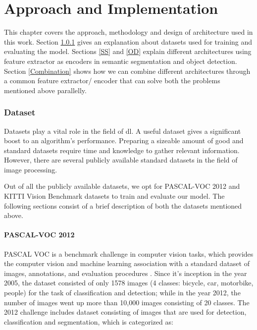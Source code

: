 
\lhead{\thepage}

\chapter{Approach and Implementation}

This chapter covers the approach, methodology and design of architecture used in this work. Section \ref{Dataset} gives an explanation about datasets used for training and evaluating the model. Sections \ref{SS} and \ref{OD} explain different architectures using feature extractor as encoders in semantic segmentation and object detection. Section \ref{Combination} shows how we can combine different architectures through a common feature extractor/ encoder that can solve both the problems mentioned above parallelly. 

\subsection{Dataset} \label{Dataset}

Datasets play a vital role in the field of \ac{dl}. A useful dataset gives a significant boost to an algorithm's performance. Preparing a sizeable amount of good and standard datasets require time and knowledge to gather relevant information. However, there are several publicly available standard datasets in the field of image processing.  

\par

Out of all the publicly available datasets, we opt for PASCAL-VOC 2012 \cite{pascal-voc-2012} and KITTI Vision Benchmark \cite{Geiger2012CVPR} datasets to train and evaluate our model. The following sections consist of a brief description of both the datasets mentioned above.

\subsubsection{PASCAL-VOC 2012} \label{PascalVOC}

PASCAL VOC is a benchmark challenge in computer vision tasks, which provides the computer vision and machine learning association with a standard dataset of images, annotations, and evaluation procedures \cite{pascal-voc-2012}. Since it's inception in the year 2005, the dataset consisted of only 1578 images (4 classes: bicycle, car, motorbike, people) for the task of classification and detection; while in the year 2012, the number of images went up more than 10,000 images consisting of 20 classes. The 2012 challenge includes dataset consisting of images that are used for detection, classification and segmentation, which is categorized as:   

